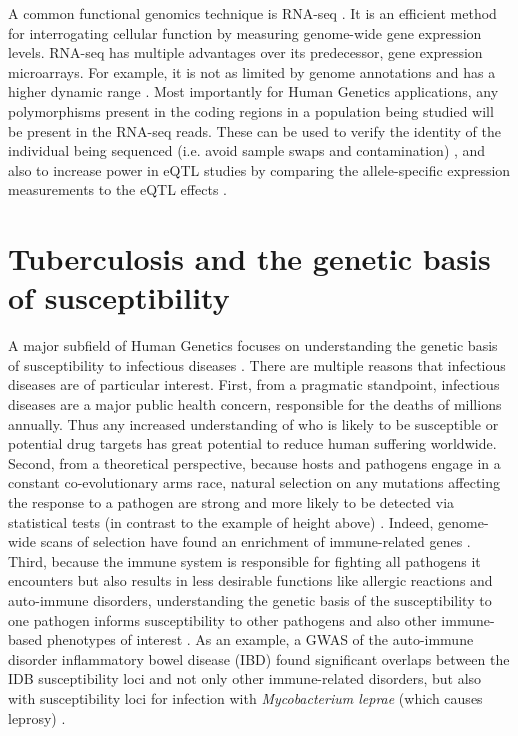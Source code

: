 A common functional genomics technique is RNA-seq \citep{Wang2009,
  Oshlack2010, Waern2011}. It is an efficient method for interrogating
cellular function by measuring genome-wide gene expression
levels. RNA-seq has multiple advantages over its predecessor, gene
expression microarrays. For example, it is not as limited by genome
annotations and has a higher dynamic range \citep{Marioni2008,
  Zhao2014}. Most importantly for Human Genetics applications, any
polymorphisms present in the coding regions in a population being
studied will be present in the RNA-seq reads. These can be used to
verify the identity of the individual being sequenced (i.e. avoid
sample swaps and contamination) \citep{Jun2012}, and also to increase
power in eQTL studies by comparing the allele-specific expression
measurements to the eQTL effects \citep{Castel2015, VandeGeijn2015}.

\section{Tuberculosis and the genetic basis of susceptibility}

A major subfield of Human Genetics focuses on understanding the
genetic basis of susceptibility to infectious diseases
\citep{Casanova2007, Chapman2012, Novembre2012, Manry2013}. There are
multiple reasons that infectious diseases are of particular
interest. First, from a pragmatic standpoint, infectious diseases are
a major public health concern, responsible for the deaths of millions
annually. Thus any increased understanding of who is likely to be
susceptible or potential drug targets has great potential to reduce
human suffering worldwide. Second, from a theoretical perspective,
because hosts and pathogens engage in a constant co-evolutionary arms
race, natural selection on any mutations affecting the response to a
pathogen are strong and more likely to be detected via statistical
tests (in contrast to the example of height above) \citep{Hamblin2002,
  Prugnolle2005, Novembre2012, Fumagalli2014, Mangano2014}. Indeed,
genome-wide scans of selection have found an enrichment of
immune-related genes \citep{Raj2013, Fumagalli2011,
  Fumagalli2014}. Third, because the immune system is responsible for
fighting all pathogens it encounters but also results in less
desirable functions like allergic reactions and auto-immune disorders,
understanding the genetic basis of the susceptibility to one pathogen
informs susceptibility to other pathogens and also other immune-based
phenotypes of interest \citep{Vannberg2011, Raj2013}. As an example, a
GWAS of the auto-immune disorder inflammatory bowel disease (IBD)
found significant overlaps between the IDB susceptibility loci and not
only other immune-related disorders, but also with susceptibility loci
for infection with \emph{Mycobacterium leprae} (which causes leprosy)
\citep{Jostins2012}.

